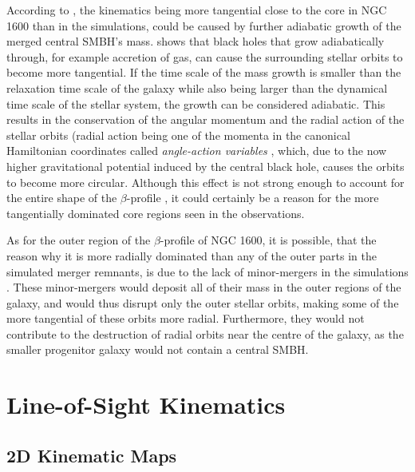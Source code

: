 \documentclass[english, oneside]{HYgradu}
\begin{document}
According to \cite{Rantala2018}, the kinematics being more tangential close to the core in NGC 1600 than in the simulations, could be caused by further adiabatic growth of the merged central SMBH's mass. \cite{Young1980} shows that black holes that grow adiabatically through, for example accretion of gas, can cause the surrounding stellar orbits to become more tangential. If the time scale of the mass growth is smaller than the relaxation time scale of the galaxy while also being larger than the dynamical time scale of the stellar system, the growth can be considered adiabatic. This results in the conservation of the angular momentum and the radial action of the stellar orbits (radial action being one of the momenta in the canonical Hamiltonian coordinates called \textit{angle-action variables} \citep[e.g.][]{BinneyTremaine}, which, due to the now higher gravitational potential induced by the central black hole, causes the orbits to become more circular. Although this effect is not strong enough to account for the entire shape of the $\beta$-profile \citep{Thomas2016}, it could certainly be a reason for the more tangentially dominated core regions seen in the observations.

As for the outer region of the $\beta$-profile of NGC 1600, it is possible, that the reason why it is more radially dominated than any of the outer parts in the simulated merger remnants, is due to the lack of minor-mergers in the simulations \citep{Rantala2018}. These minor-mergers would deposit all of their mass in the outer regions of the galaxy, and would thus disrupt only the outer stellar orbits, making some of the more tangential of these orbits more radial. Furthermore, they would not contribute to the destruction of radial orbits near the centre of the galaxy, as the smaller progenitor galaxy would not contain a central SMBH.

\section{Line-of-Sight Kinematics}

\subsection{2D Kinematic Maps}
\end{document}
